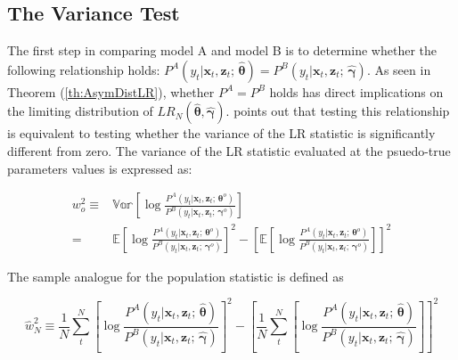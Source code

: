 \documentclass[12pt]{article}
\theoremstyle{definition}
\begin{document}
\subsection{The Variance Test}

The first step in comparing model A and model B is to determine whether the
following relationship holds: $P^{A}(y_{t} | \boldsymbol{x}_{t}, \boldsymbol{z}_{t}; \, \hat{\boldsymbol{\theta}}) = P^{B}(y_{t} | \boldsymbol{x}_{t}, \boldsymbol{z}_{t}; \, \hat{\boldsymbol{\gamma}})$.
As seen in Theorem (\ref{th:AsymDistLR}), whether $P^{A} = P^{B}$ holds has
direct implications on the limiting distribution of
$LR_{N}(\hat{\boldsymbol{\theta}}, \hat{\boldsymbol{\gamma}})$.
\citet{Voung1989} points out that testing this relationship is equivalent to testing
whether the variance of the LR statistic is significantly different from zero.
The variance of the LR statistic evaluated at the psuedo-true parameters values is
expressed as:

\begin{align*}
  w_{o}^{2} \equiv & \mathbb{Var} \left[ \log \frac{ P^{A}(y_{t} | \boldsymbol{x}_{t}, \boldsymbol{z}_{t}; \, \boldsymbol{\theta}^{o}) }{ P^{B}(y_{t} | \boldsymbol{x}_{t}, \boldsymbol{z}_{t}; \, \boldsymbol{\gamma}^{o}) } \right] \\
   = & \mathbb{E} \left[ \log \frac{ P^{A}(y_{t} | \boldsymbol{x}_{t}, \boldsymbol{z}_{t}; \, \boldsymbol{\theta}^{o}) }{ P^{B}(y_{t} | \boldsymbol{x}_{t}, \boldsymbol{z}_{t}; \, \boldsymbol{\gamma}^{o}) } \right]^{2} - \left[ \mathbb{E} \left[ \log \frac{ P^{A}(y_{t} | \boldsymbol{x}_{t}, \boldsymbol{z}_{t}; \, \boldsymbol{\theta}^{o}) }{ P^{B}(y_{t} | \boldsymbol{x}_{t}, \boldsymbol{z}_{t}; \, \boldsymbol{\gamma}^{o}) } \right] \right]^{2}
\end{align*}

The sample analogue for the population statistic is defined as

\begin{equation}
  \hat{w}^{2}_{N} \equiv \frac{1}{N} \sum_{t}^{N} \left[ \log \frac{ P^{A}(y_{t} | \boldsymbol{x}_{t}, \boldsymbol{z}_{t}; \, \hat{\boldsymbol{\theta}}) }{ P^{B}(y_{t} | \boldsymbol{x}_{t}, \boldsymbol{z}_{t}; \, \hat{\boldsymbol{\gamma}}) } \right]^{2} - \left[ \frac{1}{N} \sum_{t}^{N} \left[ \log \frac{ P^{A}(y_{t} | \boldsymbol{x}_{t}, \boldsymbol{z}_{t}; \, \hat{\boldsymbol{\theta}}) }{ P^{B}(y_{t} | \boldsymbol{x}_{t}, \boldsymbol{z}_{t}; \, \hat{\boldsymbol{\gamma}}) } \right] \right]^{2}
\end{equation}
\end{document}
